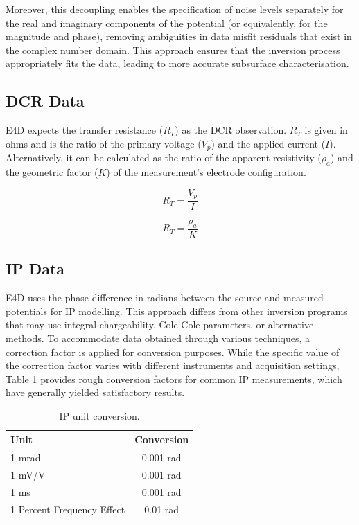 \documentclass[a4paper,12pt]{article}
\begin{document}
Moreover, this decoupling enables the specification of noise levels separately for the real and imaginary components of the potential (or equivalently, for the magnitude and phase), removing ambiguities in data misfit residuals that exist in the complex number domain. This approach ensures that the inversion process appropriately fits the data, leading to more accurate subsurface characterisation.



\subsection{DCR Data}

E4D expects the transfer resistance ($R_T$) as the DCR observation. $R_T$ is given in ohms and is the ratio of the primary voltage ($V_p$) and the applied current ($I$). Alternatively, it can be calculated as the ratio of the apparent resistivity ($\rho_a$) and the geometric factor ($K$) of the measurement's electrode configuration.

\begin{equation}
R_T = \frac{V_p}{I}
\end{equation}

\begin{equation}
R_T = \frac{\rho_a}{K}
\end{equation}

\subsection{IP Data}

E4D uses the phase difference in radians between the source and measured potentials for IP modelling. This approach differs from other inversion programs that may use integral chargeability, Cole-Cole parameters, or alternative methods. To accommodate data obtained through various techniques, a correction factor is applied for conversion purposes. While the specific value of the correction factor varies with different instruments and acquisition settings, Table 1 provides rough conversion factors for common IP measurements, which have generally yielded satisfactory results.

\begin{table}[H]
\centering
\begin{tabular}{@{}lc@{}}
\toprule
Unit                       & Conversion \\ \midrule
1 mrad                     & 0.001 rad         \\
1 mV/V                     & 0.001 rad         \\
1 ms                       & 0.001 rad         \\
1 Percent Frequency Effect & 0.01 rad          \\ \bottomrule
\end{tabular}
\caption{IP unit conversion.}
\end{table}
\end{document}
